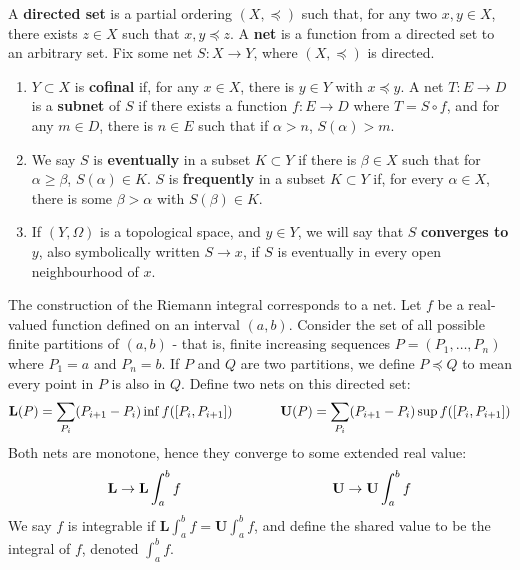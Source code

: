 \begin{definition}
    A {\bf directed set} is a partial ordering $(X, \preceq)$ such that, for any two $x,y \in X$, there exists $z \in X$ such that $x,y \preceq z$. A {\bf net} is a function from a directed set to an arbitrary set. Fix some net $S:X \to Y$, where $(X, \preceq)$ is directed.
    \begin{enumerate}
        \item $Y \subset X$ is {\bf cofinal} if, for any $x \in X$, there is $y \in Y$ with $x \preceq y$. A net $T:E \to D$ is a {\bf subnet} of $S$ if there exists a function $f:E \to D$ where $T = S \circ f$, and for any $m \in D$, there is $n \in E$ such that if $\alpha > n$, $S(\alpha) > m$.

        \item We say $S$ is {\bf eventually} in a subset $K \subset Y$ if there is $\beta \in X$ such that for $\alpha \geq \beta$, $S(\alpha) \in K$. $S$ is {\bf frequently} in a subset $K \subset Y$ if, for every $\alpha \in X$, there is some $\beta > \alpha$ with $S(\beta) \in K$.

        \item If $(Y, \Omega)$ is a topological space, and $y \in Y$, we will say that $S$ {\bf converges to} $y$, also symbolically written $S \to x$, if $S$ is eventually in every open neighbourhood of $x$.
    \end{enumerate}
\end{definition}

\begin{example}
    The construction of the Riemann integral corresponds to a net. Let $f$ be a real-valued function defined on an interval $(a,b)$. Consider the set of all possible finite partitions of $(a,b)$ - that is, finite increasing sequences $P = (P_1, \dots, P_n)$ where $P_1 = a$ and $P_n = b$. If $P$ and $Q$ are two partitions, we define $P \preceq Q$ to mean every point in $P$ is also in $Q$. Define two nets on this directed set:
    \[ \mathbf{L}(P) = \sum_{P_i} (P_{i+1} - P_i) \inf f([P_i, P_{i+1}]) \hspace{0.5in} \mathbf{U}(P) = \sum_{P_i} (P_{i+1} - P_i) \sup f([P_i, P_{i+1}]) \]
    Both nets are monotone, hence they converge to some extended real value:
    \[ \mathbf{L} \to \mathbf{L} \int_a^b f \hspace{1.5in} \mathbf{U} \to \mathbf{U} \int_a^b f \]
    We say $f$ is integrable if $\mathbf{L} \int_a^b f = \mathbf{U} \int_a^b f$, and define the shared value to be the integral of $f$, denoted $\int_a^b f$.
\end{example}

